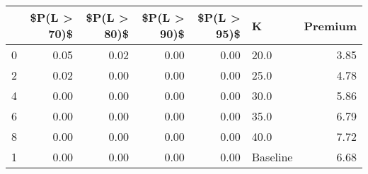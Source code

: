 \begin{tabular}{lrrrrlr}
\toprule
{} &  \$P(L > 70)\$ &  \$P(L > 80)\$ &  \$P(L > 90)\$ &  \$P(L > 95)\$ &         K &  Premium \\
\midrule
0 &         0.05 &         0.02 &         0.00 &         0.00 &      20.0 &     3.85 \\
2 &         0.02 &         0.00 &         0.00 &         0.00 &      25.0 &     4.78 \\
4 &         0.00 &         0.00 &         0.00 &         0.00 &      30.0 &     5.86 \\
6 &         0.00 &         0.00 &         0.00 &         0.00 &      35.0 &     6.79 \\
8 &         0.00 &         0.00 &         0.00 &         0.00 &      40.0 &     7.72 \\
1 &         0.00 &         0.00 &         0.00 &         0.00 &  Baseline &     6.68 \\
\bottomrule
\end{tabular}
